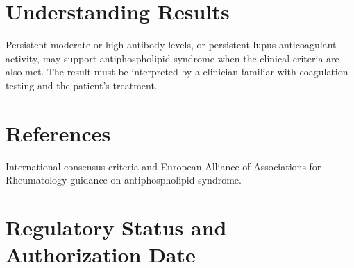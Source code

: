 \section*{Understanding Results}
Persistent moderate or high antibody levels, or persistent lupus anticoagulant activity, may support antiphospholipid syndrome when the clinical criteria are also met. The result must be interpreted by a clinician familiar with coagulation testing and the patient's treatment.

\section*{References}
International consensus criteria and European Alliance of Associations for Rheumatology guidance on antiphospholipid syndrome.

\clearpage


\section*{Regulatory Status and Authorization Date}

\clearpage
